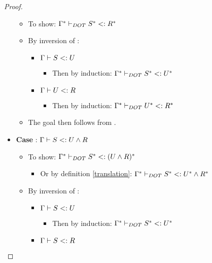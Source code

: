 \begin{proof}
\begin{itemize}
        \begin{itemize}
            \item To show: $\Gamma^{*} \vdash_{DOT} S^{*} <: R^{*}$
            \item By inversion of :
            \begin{itemize}
                \item $\Gamma \vdash S <: U$
                \begin{itemize}
                    \item Then by induction:
                        $\Gamma^{*} \vdash_{DOT} S^{*} <: U^{*}$
                \end{itemize}
                \item $\Gamma \vdash U <: R$
                \begin{itemize}
                    \item Then by induction:
                        $\Gamma^{*} \vdash_{DOT} U^{*} <: R^{*}$
                \end{itemize}
            \end{itemize}
            \item The goal then follows from .
        \end{itemize}
        \item \textbf{Case} : $\Gamma \vdash S <: U \wedge R$
        \begin{itemize}
            \item To show:
                $\Gamma^{*} \vdash_{DOT} S^{*} <: (U \wedge R)^{*}$
            \begin{itemize}
                \item Or by definition \ref{translation}: $\Gamma^{*} \vdash_{DOT} S^{*} <: U^{*} \wedge R^{*}$
            \end{itemize}
            \item By inversion of :
            \begin{itemize}
                \item $\Gamma \vdash S <: U$
                \begin{itemize}
                    \item Then by induction:
                        $\Gamma^{*} \vdash_{DOT} S^{*} <: U^{*}$
                \end{itemize}
                \item $\Gamma \vdash S <: R$
                \begin{itemize}

\end{itemize}
\end{itemize}
\end{itemize}
\end{itemize}
\end{proof}
